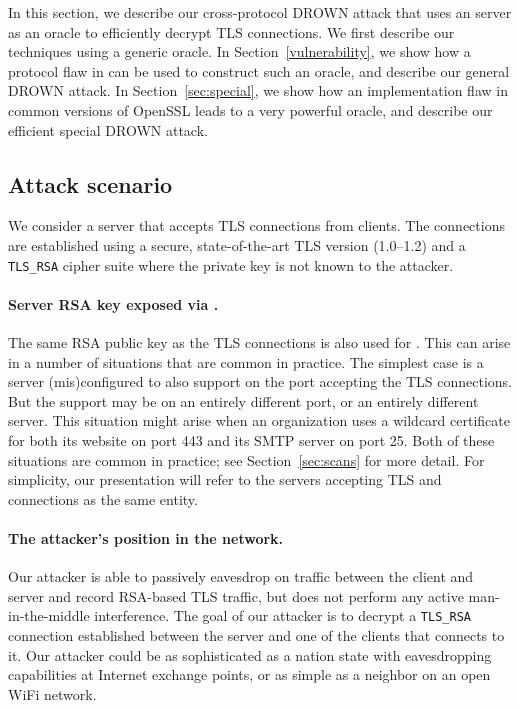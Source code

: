 In this section, we describe our cross-protocol DROWN attack that uses an \ssltwo server as an oracle to efficiently decrypt TLS connections.  We first describe our techniques using a generic \ssltwo oracle.  In Section~\ref{vulnerability}, we show how a protocol flaw in \ssltwo can be used to construct such an oracle, and describe our general DROWN attack.  In Section~\ref{sec:special}, we show how an implementation flaw in common versions of OpenSSL leads to a very powerful oracle, and describe our efficient special DROWN attack.


\subsection{Attack scenario}
\label{sec:attack-scenario}

We consider a server that accepts TLS connections from clients. The connections are established using a secure, state-of-the-art TLS version (1.0--1.2) and a \texttt{TLS\_RSA} cipher suite where the private key is not known to the attacker.

\paragraph{Server RSA key exposed via \ssltwo.}
The same RSA public key as the TLS connections is also used for \ssltwo. 
This can arise in a number of situations that are common in practice.  The simplest case is a server (mis)configured to also support \ssltwo on the port accepting the TLS connections.  But the \ssltwo support may be on an entirely different port, or an entirely different server.
This situation might arise when an organization uses a wildcard certificate for both its website on port 443 and its SMTP server on port 25.  Both of these situations are common in practice; see Section~\ref{sec:scans} for more detail.  
\fi
For simplicity, our presentation will refer to the servers accepting TLS and \ssltwo connections as the same entity.

\paragraph{The attacker's position in the network.}
Our attacker is able to passively eavesdrop on traffic between the client and server and record RSA-based TLS traffic, but does not perform any active man-in-the-middle interference.
\ifext
The goal of our attacker is to decrypt a \texttt{TLS\_RSA} connection established between the server and one of the clients that connects to it.
Our attacker could be as sophisticated as a nation state with eavesdropping capabilities at Internet exchange points, or as simple as a neighbor on an open WiFi network.
\fi

